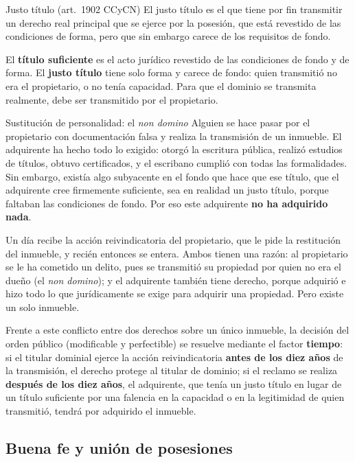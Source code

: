 \documentclass[12pt,oneside]{book}
\begin{document}
\begin{definicion}{Justo título (art.~1902 CCyCN)}
El justo título es el que tiene por fin transmitir un derecho real principal que se ejerce por la posesión, que está revestido de las condiciones de forma, pero que sin embargo carece de los requisitos de fondo.
\end{definicion}

El \textbf{título suficiente} es el acto jurídico revestido de las condiciones de fondo y de forma. El \textbf{justo título} tiene solo forma y carece de fondo: quien transmitió no era el propietario, o no tenía capacidad. Para que el dominio se transmita realmente, debe ser transmitido por el propietario.

\begin{ejemplo}{Sustitución de personalidad: el \textit{non domino}}
Alguien se hace pasar por el propietario con documentación falsa y realiza la transmisión de un inmueble. El adquirente ha hecho todo lo exigido: otorgó la escritura pública, realizó estudios de títulos, obtuvo certificados, y el escribano cumplió con todas las formalidades. Sin embargo, existía algo subyacente en el fondo que hace que ese título, que el adquirente cree firmemente suficiente, sea en realidad un justo título, porque faltaban las condiciones de fondo. Por eso este adquirente \textbf{no ha adquirido nada}.

Un día recibe la acción reivindicatoria del propietario, que le pide la restitución del inmueble, y recién entonces se entera. Ambos tienen una razón: al propietario se le ha cometido un delito, pues se transmitió su propiedad por quien no era el dueño (el \textit{non domino}); y el adquirente también tiene derecho, porque adquirió e hizo todo lo que jurídicamente se exige para adquirir una propiedad. Pero existe un solo inmueble.
\end{ejemplo}

Frente a este conflicto entre dos derechos sobre un único inmueble, la decisión del orden público (modificable y perfectible) se resuelve mediante el factor \textbf{tiempo}: si el titular dominial ejerce la acción reivindicatoria \textbf{antes de los diez años} de la transmisión, el derecho protege al titular de dominio; si el reclamo se realiza \textbf{después de los diez años}, el adquirente, que tenía un justo título en lugar de un título suficiente por una falencia en la capacidad o en la legitimidad de quien transmitió, tendrá por adquirido el inmueble.

\subsection{Buena fe y unión de posesiones}
\end{document}
